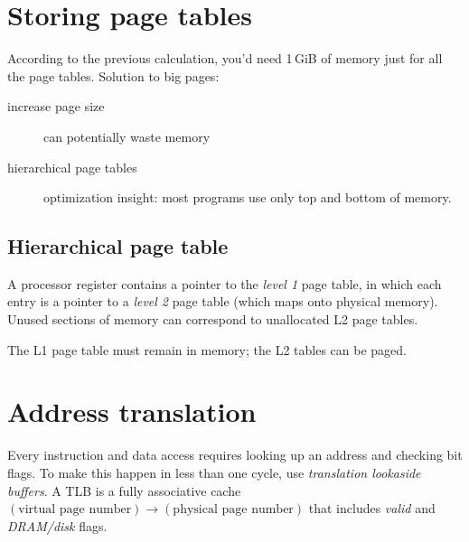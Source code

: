 \section{Storing page tables}
According to the previous calculation, you'd need 1\,GiB of memory just for all the page tables. Solution to big pages:
\begin{description}
	\item[increase page size] can potentially waste memory
	\item[hierarchical page tables] optimization insight: most programs use only top and bottom of memory.
\end{description}

\subsection{Hierarchical page table}
A processor register contains a pointer to the \emph{level 1} page table, in which each entry is a pointer to a \emph{level 2} page table (which maps onto physical memory). Unused sections of memory can correspond to unallocated L2 page tables.

The L1 page table must remain in memory; the L2 tables can be paged.

\section{Address translation}
Every instruction and data access requires looking up an address and checking bit flags. To make this happen in less than one cycle, use \emph{translation lookaside buffers}. A TLB is a fully associative cache \((\text{virtual page number})\to(\text{physical page number})\) that includes \emph{valid} and \emph{DRAM/disk} flags.